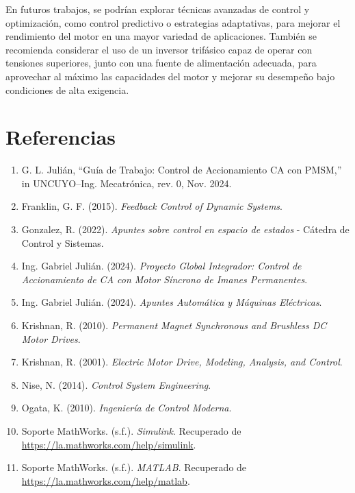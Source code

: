 \documentclass{article}
\begin{document}
En futuros trabajos, se podrían explorar técnicas avanzadas de control y optimización, como control predictivo o estrategias adaptativas, para mejorar el rendimiento del motor en una mayor variedad de aplicaciones. También se recomienda considerar el uso de un inversor trifásico capaz de operar con tensiones superiores, junto con una fuente de alimentación adecuada, para aprovechar al máximo las capacidades del motor y mejorar su desempeño bajo condiciones de alta exigencia.



\section*{Referencias}

\begin{enumerate}
    \item G. L. Julián, “Guía de Trabajo: Control de Accionamiento CA con PMSM,” in UNCUYO–Ing. Mecatrónica, rev. 0, Nov. 2024.
    \item Franklin, G. F. (2015). \textit{Feedback Control of Dynamic Systems}.
    \item Gonzalez, R. (2022). \textit{Apuntes sobre control en espacio de estados} - Cátedra de Control y Sistemas.
    \item Ing. Gabriel Julián. (2024). \textit{Proyecto Global Integrador: Control de Accionamiento de CA con Motor Síncrono de Imanes Permanentes}.
    \item Ing. Gabriel Julián. (2024). \textit{Apuntes Automática y Máquinas Eléctricas}.
    \item Krishnan, R. (2010). \textit{Permanent Magnet Synchronous and Brushless DC Motor Drives}.
    \item Krishnan, R. (2001). \textit{Electric Motor Drive, Modeling, Analysis, and Control}.
    \item Nise, N. (2014). \textit{Control System Engineering}.
    \item Ogata, K. (2010). \textit{Ingeniería de Control Moderna}.
    \item Soporte MathWorks. (s.f.). \textit{Simulink}. Recuperado de \url{https://la.mathworks.com/help/simulink}.
    \item Soporte MathWorks. (s.f.). \textit{MATLAB}. Recuperado de \url{https://la.mathworks.com/help/matlab}.
\end{enumerate}
\end{document}
